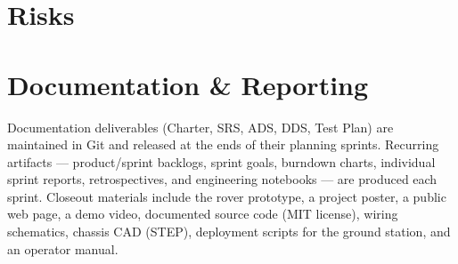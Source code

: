 \documentclass[11pt,letterpaper]{article}
\begin{document}
\section{Risks}
\begin{table}[h]
\caption{Highest-exposure project risks}
\end{table}

\section{Documentation \& Reporting}
Documentation deliverables (Charter, SRS, ADS, DDS, Test Plan) are maintained in
Git and released at the ends of their planning sprints. Recurring artifacts ---
product/sprint backlogs, sprint goals, burndown charts, individual sprint reports,
retrospectives, and engineering notebooks --- are produced each sprint. Closeout
materials include the rover prototype, a project poster, a public web page, a demo
video, documented source code (MIT license), wiring schematics, chassis CAD (STEP),
deployment scripts for the ground station, and an operator manual.


{}
\end{document}

